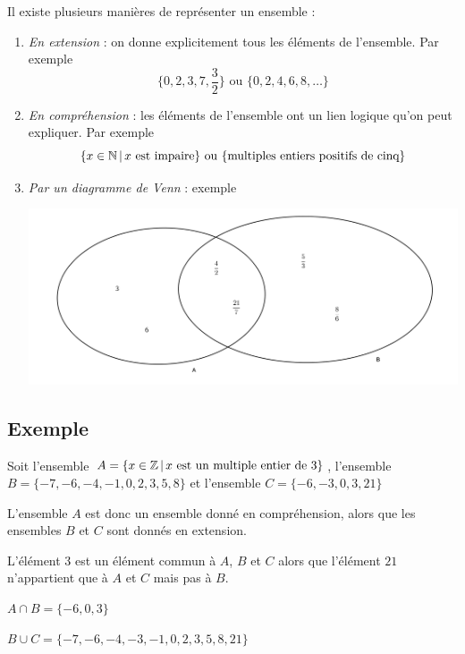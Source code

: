 Il existe plusieurs manières de représenter un ensemble :
\begin{enumerate}
\item \emph{En extension} : on donne explicitement tous les éléments de l'ensemble. Par exemple
$$
\{0,2,3,7,\frac{3}{2}\} \mbox{ ou } \{0,2,4,6,8,\dots\}
$$
\item \emph{En compréhension} : les éléments de l'ensemble ont un lien logique qu'on peut expliquer. Par exemple 
$$
\{x\in \mathbb{N} \, | \, x \mbox{ est impaire}\} \mbox{ ou } \{\mbox{multiples entiers positifs de cinq}\}
$$
\item \emph{Par un diagramme de Venn} : exemple
\begin{center}
\includegraphics{ensemble/Venn.png}
\end{center}
\end{enumerate}

\subsection{Exemple}

Soit l'ensemble $A=\{x\in \mathbb{Z} \, | \, x \mbox{ est un multiple entier de 3}\}$, l'ensemble $B = \{-7, -6, -4, -1, 0, 2, 3, 5, 8\}$ et l'ensemble $C=\{-6,-3,0,3,21\}$

L'ensemble $A$ est donc un ensemble donné en compréhension, alors que les ensembles $B$ et $C$ sont donnés en extension.

L'élément $3$ est un élément commun à $A$, $B$ et $C$ alors que l'élément $21$ n'appartient que à $A$ et $C$ mais pas à $B$.

$A\cap B = \{-6, 0, 3\}$

$B\cup C= \{-7,-6,-4,-3,-1,0,2,3,5,8,21\}$

